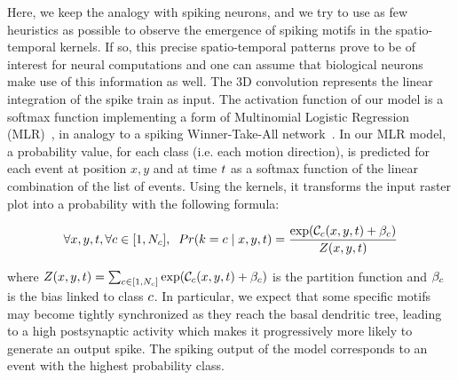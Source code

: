 \documentclass[default]{sn-jnl}%
\theoremstyle{thmstyleone}%
\theoremstyle{thmstyletwo}%
\theoremstyle{thmstylethree}%
\newcommand{\note}[1]{{\sethlcolor{yellow}\hl{#1}}}
\begin{document}
Here, we keep the analogy with spiking neurons, and we try to use as few heuristics as possible to observe the emergence of spiking motifs in the spatio-temporal kernels. If so, this precise spatio-temporal patterns prove to be of interest for neural computations and one can assume that biological neurons make use of this information as well. 
The 3D convolution represents the linear integration of the spike train as input. The activation function of our model is a softmax function implementing a form of Multinomial Logistic Regression (MLR)~\citep{grimaldi_robust_2022}, in analogy to a spiking Winner-Take-All network~\citep{nessler_bayesian_2013}. In our MLR model, a probability value, for each class (i.e. each motion direction), is predicted for each event at position $x, y$ and at time $t$ as a softmax function of the linear combination of the list of events. %
Using the kernels, it transforms the input raster plot into a probability with the following formula:

\begin{equation}\label{eq:mlr}
    \forall x, y, t, \forall c \in [1, N_c], \; \;
Pr(k=c \; \vert \;  x, y, t) =
\frac {\exp  (\mathcal{C}_c(x, y, t) +\beta_c) }{Z(x, y, t)}
\end{equation} 

where $Z(x, y, t)=\sum_{c \in [1, N_c]} \exp  (\mathcal{C}_c(x, y, t) +\beta_c)$ is the partition function and  $\beta_c$ is the bias linked to class $c$. 
In particular, we expect that some specific motifs may become tightly synchronized as they reach the basal dendritic tree, leading to a high postsynaptic activity which makes it progressively more likely to generate an output spike. The spiking output of the model corresponds to an event with the highest probability class. 
\end{document}
